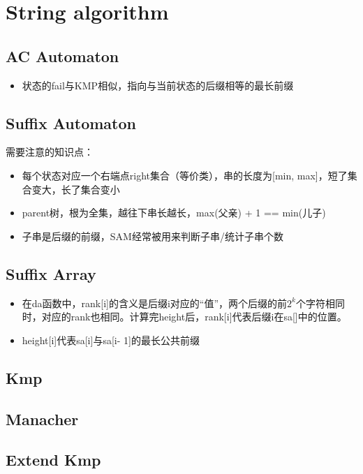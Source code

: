 \section{String algorithm}
	\subsection{AC Automaton}
		\begin{itemize}
			\item 状态的fail与KMP相似，指向与当前状态的后缀相等的最长前缀
		\end{itemize}
		
	\subsection{Suffix Automaton}
		\begin{flushleft}
			需要注意的知识点：
			\begin{itemize}
				\item 每个状态对应一个右端点right集合（等价类），串的长度为[min, max]，短了集合变大，长了集合变小
				\item parent树，根为全集，越往下串长越长，max(父亲) + 1 == min(儿子)
				\item 子串是后缀的前缀，SAM经常被用来判断子串/统计子串个数
			\end{itemize}
		\end{flushleft}
		
	\subsection{Suffix Array}
		\begin{flushleft}
			\begin{itemize}
				\item 在da函数中，rank[i]的含义是后缀i对应的“值”，两个后缀的前$2^k$个字符相同时，对应的rank也相同。计算完height后，rank[i]代表后缀i在sa[]中的位置。
				\item height[i]代表sa[i]与sa[i- 1]的最长公共前缀
			\end{itemize}
		\end{flushleft}
		
	\subsection{Kmp}
		
	\subsection{Manacher}
		
	\subsection{Extend Kmp}
		